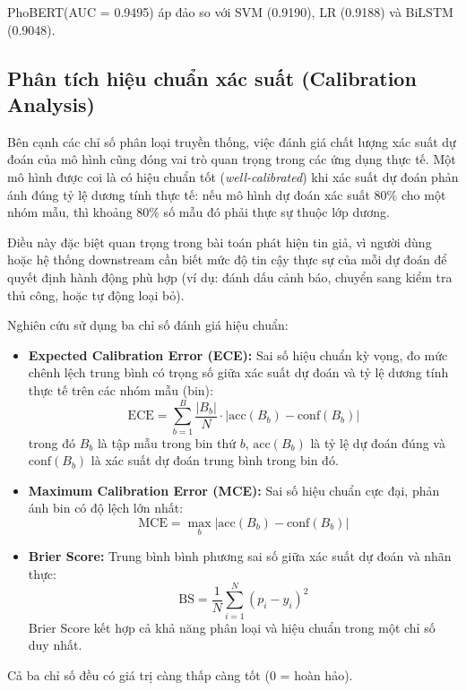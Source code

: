 \documentclass[12pt, a4paper]{report}
\newcommand{\phobert}{PhoBERT\xspace}
\newcommand{\phobertAUC}{0.9495}
\newcommand{\lrAUC}{0.9188}
\newcommand{\svmAUC}{0.9190}
\newcommand{\bilstmAUC}{0.9048}
\begin{document}
\phobert (AUC = \phobertAUC) áp đảo so với SVM (\svmAUC), LR (\lrAUC) và BiLSTM (\bilstmAUC).

\subsection{Phân tích hiệu chuẩn xác suất (Calibration Analysis)}
\label{sec:calibration}

Bên cạnh các chỉ số phân loại truyền thống, việc đánh giá chất lượng xác suất dự đoán của mô hình cũng đóng vai trò quan trọng trong các ứng dụng thực tế. Một mô hình được coi là có hiệu chuẩn tốt (\textit{well-calibrated}) khi xác suất dự đoán phản ánh đúng tỷ lệ dương tính thực tế: nếu mô hình dự đoán xác suất 80\% cho một nhóm mẫu, thì khoảng 80\% số mẫu đó phải thực sự thuộc lớp dương.

Điều này đặc biệt quan trọng trong bài toán phát hiện tin giả, vì người dùng hoặc hệ thống downstream cần biết mức độ tin cậy thực sự của mỗi dự đoán để quyết định hành động phù hợp (ví dụ: đánh dấu cảnh báo, chuyển sang kiểm tra thủ công, hoặc tự động loại bỏ).

Nghiên cứu sử dụng ba chỉ số đánh giá hiệu chuẩn:

\begin{itemize}[leftmargin=2em]
  \item \textbf{Expected Calibration Error (ECE):} Sai số hiệu chuẩn kỳ vọng, đo mức chênh lệch trung bình có trọng số giữa xác suất dự đoán và tỷ lệ dương tính thực tế trên các nhóm mẫu (bin):
  \[
    \text{ECE} = \sum_{b=1}^{B} \frac{|B_b|}{N} \cdot |\text{acc}(B_b) - \text{conf}(B_b)|
  \]
  trong đó $B_b$ là tập mẫu trong bin thứ $b$, $\text{acc}(B_b)$ là tỷ lệ dự đoán đúng và $\text{conf}(B_b)$ là xác suất dự đoán trung bình trong bin đó.

  \item \textbf{Maximum Calibration Error (MCE):} Sai số hiệu chuẩn cực đại, phản ánh bin có độ lệch lớn nhất:
  \[
    \text{MCE} = \max_{b} |\text{acc}(B_b) - \text{conf}(B_b)|
  \]

  \item \textbf{Brier Score:} Trung bình bình phương sai số giữa xác suất dự đoán và nhãn thực:
  \[
    \text{BS} = \frac{1}{N} \sum_{i=1}^{N} (p_i - y_i)^2
  \]
  Brier Score kết hợp cả khả năng phân loại và hiệu chuẩn trong một chỉ số duy nhất.
\end{itemize}

Cả ba chỉ số đều có giá trị càng thấp càng tốt (0 = hoàn hảo).
\end{document}
